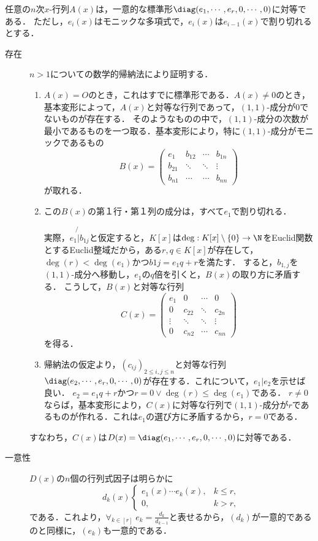 \documentclass[uplatex, dvipdfmx]{jsreport}
\begin{document}
\begin{theorem}[多項式係数の行列の単因子標準形]
    任意の$n$次$x$-行列$A(x)$は，一意的な標準形$\diag(e_1,\cdots,e_r,0,\cdots,0)$に対等である．
    ただし，$e_i(x)$はモニックな多項式で，$e_i(x)$は$e_{i-1}(x)$で割り切れるとする．
\end{theorem}
\begin{Proof}\mbox{}
    \begin{description}
        \item[存在] $n>1$についての数学的帰納法により証明する．
        \begin{enumerate}
            \item $A(x)=O$のとき，これはすでに標準形である．$A(x)\ne0$のとき，基本変形によって，$A(x)$と対等な行列であって，$(1,1)$-成分が$0$でないものが存在する．
            そのようなものの中で，$(1,1)$-成分の次数が最小であるものを一つ取る．基本変形により，特に$(1,1)$-成分がモニックであるもの
            \[B(x)=\begin{pmatrix}e_1&b_{12}&\cdots&b_{1n}\\b_{21}&\ddots&\ddots&\vdots\\b_{n1}&\cdots&\cdots&b_{nn}\end{pmatrix}\]
            が取れる．
            \item この$B(x)$の第１行・第１列の成分は，すべて$e_1$で割り切れる．
            
            実際，$e_1\not{|}b_{1j}$と仮定すると，$K[x]$は$\deg:K[x]\setminus\{0\}\to\N$をEuclid関数とするEuclid整域だから，ある$r,q\in K[x]$が存在して，$\deg(r)<\deg(e_1)$かつ$b{1j}=e_1q+r$を満たす．
            すると，$b_{1,j}$を$(1,1)$-成分へ移動し，$e_1$の$q$倍を引くと，$B(x)$の取り方に矛盾する．
            こうして，$B(x)$と対等な行列
            \[C(x)=\begin{pmatrix}e_1&0&\cdots&0\\0&c_{22}&\ddots&c_{2n}\\\vdots&\ddots&\ddots&\vdots\\0&c_{n2}&\cdots&c_{nn}\end{pmatrix}\]
            を得る．
            \item 帰納法の仮定より，$(c_{ij})_{2\le i,j\le n}$と対等な行列$\diag(e_2,\cdots,e_r,0,\cdots,0)$が存在する．これについて，$e_1|e_2$を示せば良い．
            $e_2=e_1q+r$かつ$r=0\lor\deg(r)\le\deg(e_1)$である．
            $r\ne 0$ならば，基本変形により，$C(x)$に対等な行列で$(1,1)$-成分が$r$であるものが作れる．これは$e_1$の選び方に矛盾するから，$r=0$である．
        \end{enumerate}
        すなわち，$C(x)$は$D(x)=\diag(e_1,\cdots,e_r,0,\cdots,0)$に対等である．
        \item[一意性] 
        $D(x)$の$n$個の行列式因子は明らかに
        \[d_k(x)\begin{cases}
            e_1(x)\cdots e_k(x),&k\le r,\\
            0,&k>r,
        \end{cases}\]
        である．これより，$\forall_{k\in[r]}\;e_k=\frac{d_k}{d_{k-1}}$と表せるから，$(d_k)$が一意的であるのと同様に，$(e_k)$も一意的である．
    \end{description}
\end{Proof}
\end{document}
